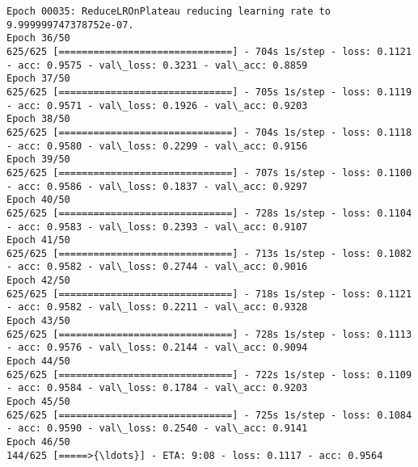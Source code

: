 \documentclass[11pt]{article}
\begin{document}
\begin{Verbatim}[commandchars=\\\{\}]
Epoch 00035: ReduceLROnPlateau reducing learning rate to 9.999999747378752e-07.
Epoch 36/50
625/625 [==============================] - 704s 1s/step - loss: 0.1121 - acc: 0.9575 - val\_loss: 0.3231 - val\_acc: 0.8859
Epoch 37/50
625/625 [==============================] - 705s 1s/step - loss: 0.1119 - acc: 0.9571 - val\_loss: 0.1926 - val\_acc: 0.9203
Epoch 38/50
625/625 [==============================] - 704s 1s/step - loss: 0.1118 - acc: 0.9580 - val\_loss: 0.2299 - val\_acc: 0.9156
Epoch 39/50
625/625 [==============================] - 707s 1s/step - loss: 0.1100 - acc: 0.9586 - val\_loss: 0.1837 - val\_acc: 0.9297
Epoch 40/50
625/625 [==============================] - 728s 1s/step - loss: 0.1104 - acc: 0.9583 - val\_loss: 0.2393 - val\_acc: 0.9107
Epoch 41/50
625/625 [==============================] - 713s 1s/step - loss: 0.1082 - acc: 0.9582 - val\_loss: 0.2744 - val\_acc: 0.9016
Epoch 42/50
625/625 [==============================] - 718s 1s/step - loss: 0.1121 - acc: 0.9582 - val\_loss: 0.2211 - val\_acc: 0.9328
Epoch 43/50
625/625 [==============================] - 728s 1s/step - loss: 0.1113 - acc: 0.9576 - val\_loss: 0.2144 - val\_acc: 0.9094
Epoch 44/50
625/625 [==============================] - 722s 1s/step - loss: 0.1109 - acc: 0.9584 - val\_loss: 0.1784 - val\_acc: 0.9203
Epoch 45/50
625/625 [==============================] - 725s 1s/step - loss: 0.1084 - acc: 0.9590 - val\_loss: 0.2540 - val\_acc: 0.9141
Epoch 46/50
144/625 [=====>{\ldots}] - ETA: 9:08 - loss: 0.1117 - acc: 0.9564
    \end{Verbatim}
\end{document}
